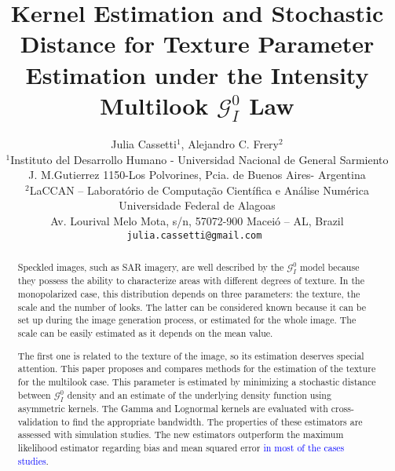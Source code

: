 \documentclass[a4paper]{article} %
\date{} %
\begin{document}
\thispagestyle{empty}

\title{\textbf{Kernel Estimation and Stochastic Distance for Texture Parameter Estimation under the Intensity Multilook $\mathcal G_I^0$ Law}}

\author{Julia Cassetti{\small $^1$}, Alejandro C. Frery{\small $^2$}\\ %
	{\small $^1$Instituto del Desarrollo Humano -  Universidad Nacional de General Sarmiento} \\
	{\small J. M.Gutierrez 1150-Los Polvorines, Pcia. de Buenos Aires- Argentina}\\\small 
	$^2$LaCCAN -- Laborat\'orio de Computa\c c\~ao Cient\'ifica e An\'alise Num\'erica\\
	\small Universidade Federal de Alagoas\\
	\small Av. Lourival Melo Mota, s/n, 57072-900 Macei\'o -- AL, Brazil\\
	\tt{julia.cassetti@gmail.com} %
}%

\date{} %
\maketitle\thispagestyle{empty} %


\begin{abstract}
Speckled images, such as SAR imagery, are well described by the $\mathcal G_I^0$ model because they possess the ability to characterize areas with different degrees of texture. 
In the monopolarized case, this distribution depends on three parameters: the texture, the scale and the number of looks.
The latter can be considered known because it can be set up during the image generation process, or estimated for the whole image.
The scale can be easily estimated as it depends on the mean value.

The first one is related to the texture of the image, so its estimation deserves special attention.
This paper proposes and compares methods for the estimation of the texture for the multilook case. 
This parameter is estimated by minimizing a stochastic distance between $\mathcal G_I^0$ density and an estimate of the underlying density function using asymmetric kernels.
The Gamma and Lognormal kernels are evaluated with cross-validation to find the appropriate bandwidth.
The properties of these estimators are assessed with simulation studies. 
The new estimators outperform the maximum likelihood estimator regarding bias and mean squared error \textcolor{blue}{in most of the cases studies}.
\end{abstract}
\end{document}

